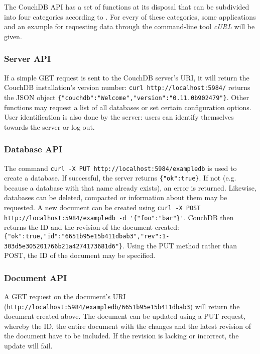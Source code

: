 The CouchDB API has a set of functions at its disposal that can be subdivided into four categories according to . For every of these categories, some applications and an example for requesting data through the command-line tool \textit{cURL} will be given.

\subsubsection{Server API}

\lstset{language=bash}
If a simple GET request is sent to the CouchDB server's URI, it will return the CouchDB installation's version number: \lstinline!curl http://localhost:5984/! returns the JSON object \lstinline!{"couchdb":"Welcome","version":"0.11.0b902479"}!. Other functions may request a list of all databases or set certain configuration options. User identification is also done by the server: users can identify themselves towards the server or log out.

\subsubsection{Database API}

The command \lstinline!curl -X PUT http://localhost:5984/exampledb! is used to create a database. If successful, the server returns \lstinline!{"ok":true}!. If not (e.g. because a database with that name already exists), an error is returned. Likewise, databases can be deleted, compacted or information about them may be requested. A new document can be created using \lstinline!curl -X POST http://localhost:5984/exampledb -d '{"foo":"bar"}'!. CouchDB then returns the ID and the revision of the document created:
\lstinline!{"ok":true,"id":"6651b95e15b411dbab3","rev":1-303d5e305201766b21a4274173681d6"}!. Using the PUT method rather than POST, the ID of the document may be specified.

\subsubsection{Document API}

A GET request on the document's URI (\lstinline!http://localhost:5984/exampledb/6651b95e15b411dbab3!) will return the document created above. The document can be updated using a PUT request, whereby the ID, the entire document with the changes and the latest revision of the document have to be included. If the revision is lacking or incorrect, the update will fail.

